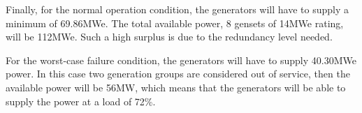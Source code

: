 Finally, for the normal operation condition, the generators will have to supply a minimum of 69.86MWe. The total available power, 8 gensets of 14MWe rating, will be 112MWe. Such a high surplus is due to the redundancy level needed. 

For the worst-case failure condition, the generators will have to supply 40.30MWe power. In this case two generation groups are considered out of service, then the available power will be 56MW, which means that the generators will be able to supply the power at a load of 72\%.
